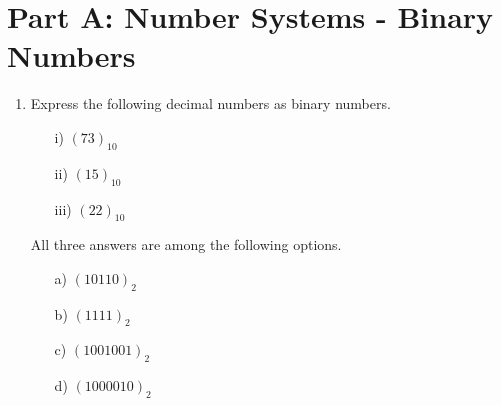 \documentclass[]{report}
\begin{document}
\section*{Part A: Number Systems - Binary Numbers}
\begin{enumerate}
\item Express the following decimal numbers as binary numbers.
  \begin{multicols}{4}
    \begin{itemize}
    \item[i)] $(73)_{10}$
    \item[ii)] $(15)_{10}$
    \item[iii)] $(22)_{10}$
    \end{itemize}
  \end{multicols}

  All three answers are among the following options.
  \begin{multicols}{4}
    \begin{itemize}
    \item[a)] $(10110)_{2}$ %
    \item[b)] $(1111)_{2}$ %
    \item[c)] $(1001001)_{2}$ %
    \item[d)] $(1000010)_{2}$ %
    \end{itemize}
  \end{multicols}


\end{enumerate}
\end{document}
